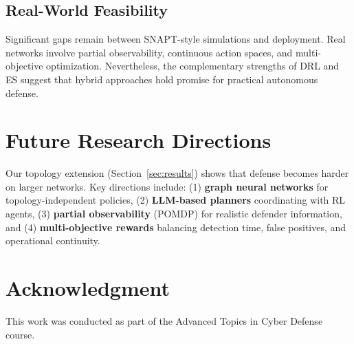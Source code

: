 \documentclass[conference, 10pt]{IEEEtran}
\begin{document}
\subsection{Real-World Feasibility}

Significant gaps remain between SNAPT-style simulations and deployment. Real networks involve partial observability, continuous action spaces, and multi-objective optimization. Nevertheless, the complementary strengths of DRL and ES suggest that hybrid approaches hold promise for practical autonomous defense.

\section{Future Research Directions}

Our topology extension (Section~\ref{sec:results}) shows that defense becomes harder on larger networks. Key directions include: (1) \textbf{graph neural networks} for topology-independent policies, (2) \textbf{LLM-based planners} coordinating with RL agents, (3) \textbf{partial observability} (POMDP) for realistic defender information, and (4) \textbf{multi-objective rewards} balancing detection time, false positives, and operational continuity.

\section*{Acknowledgment}
This work was conducted as part of the Advanced Topics in Cyber Defense course.
\end{document}
